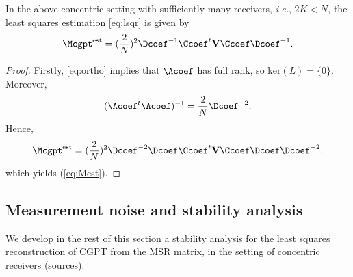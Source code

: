 \begin{lemma}\label{lem:inv} In the above concentric setting with sufficiently many receivers, \emph{i.e.},
 $2K < N$, the least squares estimation \eqref{eq:lsqr} is given by
\begin{equation}
\Mcgpt^{\mathrm{est}} = (\frac{2}{N})^2 \Dcoef^{-1} \Ccoef^t
\mathbf{V} \Ccoef \Dcoef^{-1}. \label{eq:Mest}
\end{equation}
\end{lemma}
\begin{proof} Firstly, \eqref{eq:ortho} implies that $\Acoef$ has full rank,
so $\mathrm{ker }(L) =\{0\}$. Moreover, $$ (\Acoef^t \Acoef)^{-1}
= \frac{2}{N} \Dcoef^{-2}.$$ Hence,
$$
\Mcgpt^{\mathrm{est}} = (\frac{2}{N})^2 \Dcoef^{-2} \Dcoef
\Ccoef^t \mathbf{V} \Ccoef \Dcoef \Dcoef^{-2},
$$
which yields (\ref{eq:Mest}).
\end{proof}

\subsection{Measurement noise and stability analysis}

We develop in the rest of this section a stability analysis for
the least squares reconstruction of CGPT from the MSR matrix, in
the setting of concentric receivers (sources).

